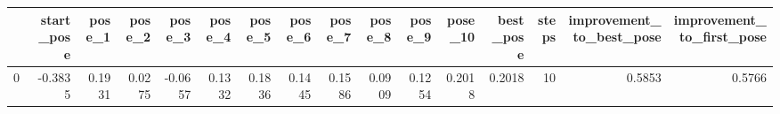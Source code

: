 \begin{tabular}{lrrrrrrrrrrrrrrr}
\toprule
{} &  start\_pose &  pose\_1 &  pose\_2 &  pose\_3 &  pose\_4 &  pose\_5 &  pose\_6 &  pose\_7 &  pose\_8 &  pose\_9 &  pose\_10 &  best\_pose &  steps &  improvement\_to\_best\_pose &  improvement\_to\_first\_pose \\
\midrule
0 &     -0.3835 &  0.1931 &  0.0275 & -0.0657 &  0.1332 &  0.1836 &  0.1445 &  0.1586 &  0.0909 &  0.1254 &   0.2018 &     0.2018 &     10 &                    0.5853 &                     0.5766 \\
\bottomrule
\end{tabular}
